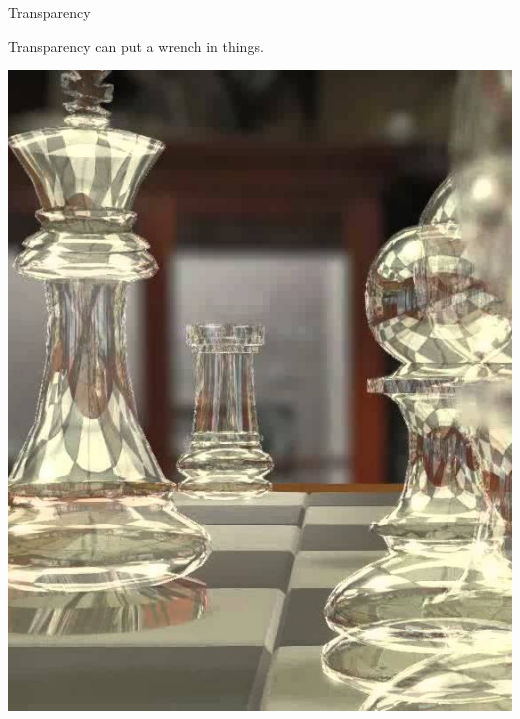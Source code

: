 \documentclass{lug}
\newcommand{\splitslide}[4]{
    \noindent
    \begin{minipage}{#1 \textwidth - #2 }
        #3
    \end{minipage}%
    \hspace{ \dimexpr #2 * 2 \relax }%
    \begin{minipage}{\textwidth - #1 \textwidth - #2 }
        #4
    \end{minipage}
}
\begin{document}
\begin{frame}{Transparency}
    \splitslide{0.65}{.7em}{
        \small

        Transparency can put a wrench in things.

    }{
        \includegraphics[width=\textwidth]{graphics/transparent}
    }
\end{frame}
\end{document}

